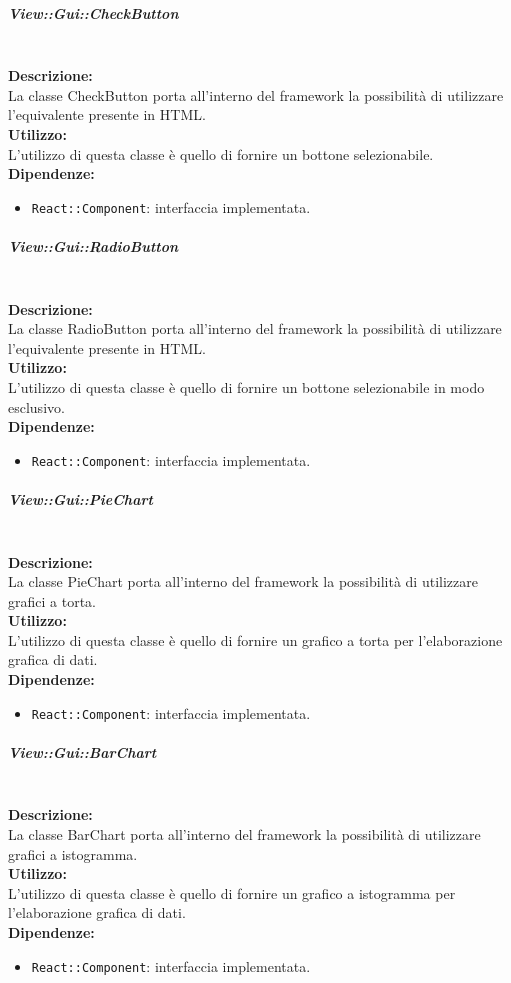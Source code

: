 \subparagraph{View\-::Gui\-::Check\-Button}\label{gui-check}\mbox{}\\
\textbf{Descrizione:}\\
La classe CheckButton porta all'interno del framework la possibilità di utilizzare l'equivalente presente in HTML.\\
\textbf{Utilizzo:}\\
L'utilizzo di questa classe è quello di fornire un bottone selezionabile.\\
\textbf{Dipendenze:}
\begin{itemize}
	\item \texttt{React::Component}: interfaccia implementata.
\end{itemize}

\subparagraph{View\-::Gui\-::Radio\-Button}\label{gui-radio}\mbox{}\\
\textbf{Descrizione:}\\
La classe RadioButton porta all'interno del framework la possibilità di utilizzare l'equivalente presente in HTML.\\
\textbf{Utilizzo:}\\
L'utilizzo di questa classe è quello di fornire un bottone selezionabile in modo esclusivo.\\
\textbf{Dipendenze:}
\begin{itemize}
	\item \texttt{React::Component}: interfaccia implementata.
\end{itemize}

\subparagraph{View\-::Gui\-::Pie\-Chart}\label{gui-pie}\mbox{}\\
\textbf{Descrizione:}\\
La classe PieChart porta all'interno del framework la possibilità di utilizzare grafici a torta.\\
\textbf{Utilizzo:}\\
L'utilizzo di questa classe è quello di fornire un grafico a torta per l'elaborazione grafica di dati.\\
\textbf{Dipendenze:}
\begin{itemize}
	\item \texttt{React::Component}: interfaccia implementata.
\end{itemize}

\subparagraph{View\-::Gui\-::Bar\-Chart}\label{gui-bar}\mbox{}\\
\textbf{Descrizione:}\\
La classe BarChart porta all'interno del framework la possibilità di utilizzare grafici a istogramma.\\
\textbf{Utilizzo:}\\
L'utilizzo di questa classe è quello di fornire un grafico a istogramma per l'elaborazione grafica di dati.\\
\textbf{Dipendenze:}
\begin{itemize}
	\item \texttt{React::Component}: interfaccia implementata.
\end{itemize}